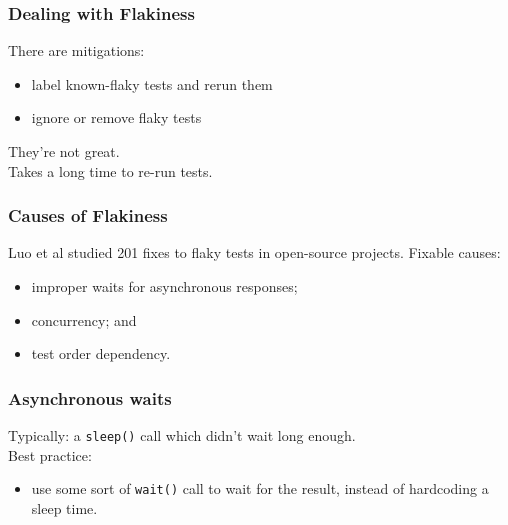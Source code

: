 \documentclass{beamer}
\newenvironment{changemargin}[1]{%
  \begin{list}{}{%
    \setlength{\topsep}{0pt}%
    \setlength{\leftmargin}{#1}%
    \setlength{\rightmargin}{1em}
    \setlength{\listparindent}{\parindent}%
    \setlength{\itemindent}{\parindent}%
    \setlength{\parsep}{\parskip}%
  }%
  \item[]}{\end{list}}
\begin{document}
\begin{frame}[fragile]
  \frametitle{Dealing with Flakiness}
  \Large
  \begin{changemargin}{1cm}
    There are mitigations:
    \begin{itemize}
    \item label known-flaky tests and rerun them
    \item ignore or remove flaky tests
    \end{itemize}
    They're not great. \\
    Takes a long time to re-run tests.
  \end{changemargin}
\end{frame}

\begin{frame}[fragile]
  \frametitle{Causes of Flakiness}
  \Large
  \begin{changemargin}{1cm}
    Luo et al studied 201 fixes to flaky tests in open-source projects. Fixable causes:
    \begin{itemize}
    \item improper waits for asynchronous responses;
    \item concurrency; and
    \item test order dependency.
    \end{itemize}
  \end{changemargin}
\end{frame}

\begin{frame}[fragile]
  \frametitle{Asynchronous waits}
  \Large
  \begin{changemargin}{1cm}
    Typically: a \texttt{sleep()} call which didn't wait long enough.\\[1em]
    Best practice:
    \begin{itemize}
      \item use some sort of \texttt{wait()} call to wait for the result,
        instead of hardcoding a sleep time.
    \end{itemize}
  \end{changemargin}
\end{frame}
\end{document}
